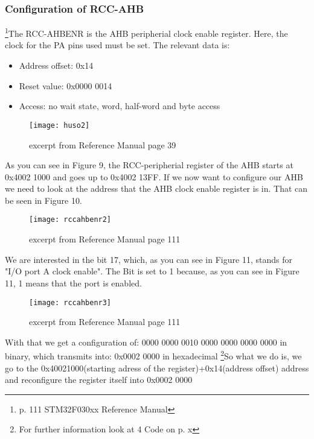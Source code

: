 \documentclass[11pt]{scrartcl}
\begin{document}
	\subsubsection{Configuration of RCC-AHB}
\footnote{\label{foot:14}p. 111 STM32F030xx Reference Manual}The RCC-AHBENR is the AHB peripherial clock enable register. Here, the clock for the PA pins used must be set. The relevant data is:
\begin{itemize}
  \item Address offset: 0x14
  \item Reset value: 0x0000 0014
  \item Access: no wait state, word, half-word and byte access
\end{itemize}
\begin{figure}[h]
		\centering
		\texttt{[image: huso2]}
		\caption{excerpt from Reference Manual page 39}
\end{figure}	
As you can see in Figure 9, the RCC-peripherial register of the AHB starts at 0x4002 1000 and goes up to 0x4002 13FF. If we now want to configure our AHB we need to look at the address that the AHB clock enable register is in. That can be seen in Figure 10.
\newpage
\begin{figure}[h]
		\centering
		\texttt{[image: rccahbenr2]}
		\caption{excerpt from Reference Manual page 111}
\end{figure}	
We are interested in the bit 17, which, as you can see in Figure 11, stands for "I/O port A clock enable". The Bit is set to 1 because, as you can see in Figure 11, 1 means that the port is enabled. 
\begin{figure}[h]
		\centering
		\texttt{[image: rccahbenr3]}
		\caption{excerpt from Reference Manual page 111}
\end{figure}	
\newline
With that we get a configuration of: 0000 0000 0010 0000 0000 0000 0000 in binary, which transmits into:\newline
0x0002 0000 in hexadecimal\newline\newline
\footnote{\label{foot:15}For further information look at 4 Code on p. x}So what we do is, we go to the 0x40021000(starting adress of the register)+0x14(address offset) address and reconfigure the register itself into 0x0002 0000



\newpage
\end{document}
